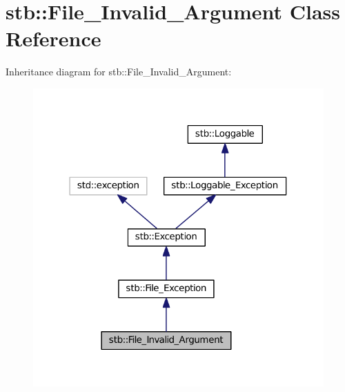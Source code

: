 \hypertarget{classstb_1_1File__Invalid__Argument}{\section{stb\+:\+:File\+\_\+\+Invalid\+\_\+\+Argument Class Reference}
\label{classstb_1_1File__Invalid__Argument}
}


Inheritance diagram for stb\+:\+:File\+\_\+\+Invalid\+\_\+\+Argument\+:
\nopagebreak
\begin{figure}[H]
\begin{center}
\leavevmode
\includegraphics[width=316pt]{classstb_1_1File__Invalid__Argument__inherit__graph}
\end{center}
\end{figure}


